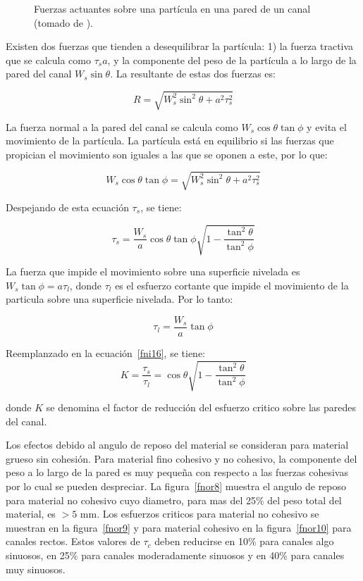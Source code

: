 \documentclass[11pt, oneside]{article}
\begin{document}
\begin{figure}[h!]
\centering
\caption{Fuerzas actuantes sobre una part\'icula en una pared de un canal (tomado de \cite{Chau}).}
\label{fnor7}
\end{figure}

Existen dos fuerzas que tienden a desequilibrar la part\'icula: 1) la fuerza tractiva que se calcula como $\tau_s a$, y la componente del peso de la part\'icula a lo largo de la pared del canal $W_s \sin \theta$. La resultante de estas dos fuerzas es:

$$
R=\sqrt{W_s^2 \sin^2 \theta + a^2 \tau_s^2}   
$$

La fuerza normal a la pared del canal se calcula como $W_s \cos \theta \tan \phi$ y evita el movimiento de la part\'icula. La part\'icula est\'a en equilibrio si las fuerzas que propician el movimiento son iguales a las que se oponen a este, por lo que:

$$
W_s \cos \theta \tan \phi =\sqrt{W_s^2 \sin^2 \theta + a^2 \tau_s^2}   
$$

Despejando de esta ecuaci\'on $\tau_s$, se tiene:

\begin{equation}
\tau_s = \frac{W_s}{a}\cos \theta \tan \phi \sqrt{1-\frac{\tan^2 \theta}{\tan^2 \phi}}
\label{fni16}
\end{equation}

La fuerza que impide el movimiento sobre una superficie nivelada es $W_s \tan \phi = a \tau_l$, donde $\tau_l$ es el esfuerzo cortante que impide el movimiento de la particula sobre una superficie nivelada. Por lo tanto:

$$
\tau_l = \frac{W_s}{a} \tan \phi
$$

Reemplanzado en la ecuaci\'on~\ref{fni16}, se tiene:
\begin{equation}
K = \frac{\tau_s}{\tau_l} = \cos \theta \sqrt{1-\frac{\tan^2 \theta}{\tan^2 \phi}}
\label{fni17}
\end{equation}

donde $K$ se denomina el factor de reducci\'on del esfuerzo critico sobre las paredes del canal.

Los efectos debido al angulo de reposo del material se consideran para material grueso sin cohesi\'on. Para material fino cohesivo y no cohesivo, la componente del peso a lo largo de la pared es muy pequeña con respecto a las fuerzas cohesivas por lo cual se pueden despreciar. La figura~\ref{fnor8} muestra el angulo de reposo para material no cohesivo cuyo diametro, para mas del 25\% del peso total del material, es $>5$ mm. Los esfuerzos criticos para material no cohesivo se muestran en la figura~\ref{fnor9} y para material cohesivo en la figura~\ref{fnor10} para canales rectos. Estos valores de $\tau_c$ deben reducirse en 10\% para canales algo sinuosos, en 25\% para canales moderadamente sinuosos y en 40\% para canales muy sinuosos. 
\end{document}
